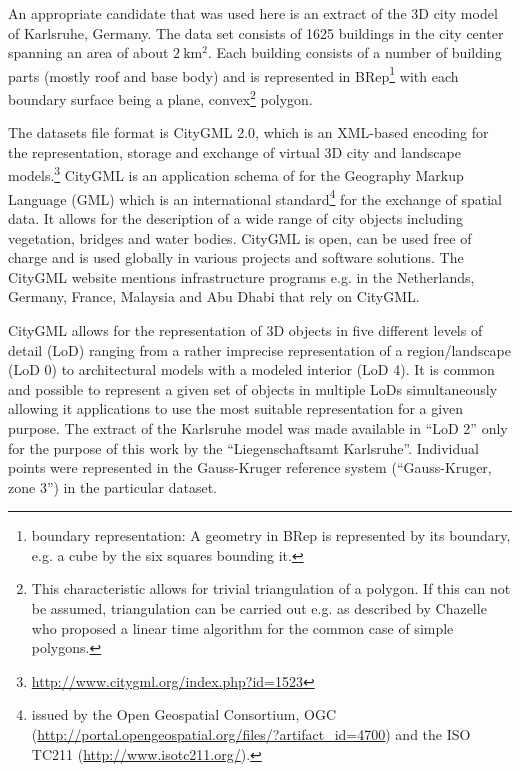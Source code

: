 \documentclass[paper=a4, fontsize=11pt]{scrartcl} %
\numberwithin{equation}{section} %
\numberwithin{figure}{section} %
\numberwithin{table}{section} %
\begin{document}
An appropriate candidate that was used here is an extract of the 3D city model of Karlsruhe, Germany. The data set consists of 1625 buildings in the city center spanning an area of about $\SI{2}{\kilo\meter^2}$. Each building consists of a number of building parts (mostly roof and base body) and is represented in BRep\footnote{boundary representation: A geometry in BRep is represented by its boundary, e.g. a cube by the six squares bounding it.} with each boundary surface being a plane, convex\footnote{This characteristic allows for trivial triangulation of a polygon. If this can not be assumed, triangulation can be carried out e.g. as described by Chazelle \cite{chazelle1991} who proposed a linear time algorithm for the common case of simple polygons.  } polygon. 

The datasets file format is CityGML 2.0, which is an XML-based encoding for the representation, storage and exchange of virtual 3D city and landscape models.\footnote{\url{http://www.citygml.org/index.php?id=1523}} CityGML is an application schema of for the Geography Markup Language (GML) which is an international standard\footnote{issued by the Open Geospatial Consortium, OGC (\url{http://portal.opengeospatial.org/files/?artifact_id=4700}) and the ISO TC211 (\url{http://www.isotc211.org/}).} for the exchange of spatial data. It allows for the description of a wide range of city objects including vegetation, bridges and water bodies. CityGML is open, can be used free of charge and is used globally in various projects and software solutions. The CityGML website mentions infrastructure programs e.g. in the Netherlands, Germany, France, Malaysia and Abu Dhabi that rely on CityGML.  

CityGML allows for the representation of 3D objects in five different levels of detail (LoD) ranging from a rather imprecise representation of a region/landscape (LoD 0) to architectural models with a modeled interior (LoD 4). It is common and possible to represent a given set of objects in multiple LoDs simultaneously allowing it applications to use the most suitable representation for a given purpose. The extract of the Karlsruhe model was made available in ``LoD 2'' only for the purpose of this work by the ``Liegenschaftsamt Karlsruhe''. Individual points were represented in the Gauss-Kruger reference system (``Gauss-Kruger, zone 3'') in the particular dataset.
\end{document}
